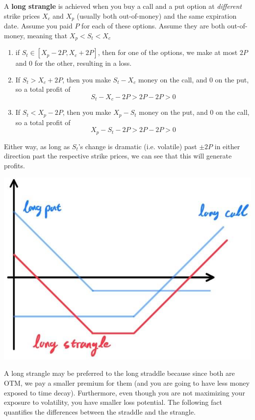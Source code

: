 \documentclass{article}
\begin{document}
  \begin{definition}
    A \textbf{long strangle} is achieved when you buy a call and a put option at \textit{different} strike prices $X_c$ and $X_p$ (usually both out-of-money) and the same expiration date. Assume you paid $P$ for each of these options. Assume they are both out-of-money, meaning that $X_p < S_t < X_c$
    \begin{enumerate}
      \item if $S_t \in [X_p - 2P, X_c + 2P]$, then for one of the options, we make at most $2P$ and $0$ for the other, resulting in a loss. 
      \item If $S_t > X_c + 2P$, then you make $S_t - X_c$ money on the call, and $0$ on the put, so a total profit of 
      \[S_t - X_c - 2P > 2P - 2P > 0\]
      
      \item If $S_t < X_p - 2P$, then you make $X_p - S_t$ money on the put, and $0$ on the call, so a total profit of 
      \[X_p - S_t - 2P > 2P - 2P > 0\]
    \end{enumerate}
    Either way, as long as $S_t$'s change is dramatic (i.e. volatile) past $\pm 2P$ in either direction past the respective strike prices, we can see that this will generate profits. 
    \begin{center}
      \includegraphics[scale=0.3]{img/long_strangle.jpg}
    \end{center}
  \end{definition}

  A long strangle may be preferred to the long straddle because since both are OTM, we pay a smaller premium for them (and you are going to have less money exposed to time decay). Furthermore, even though you are not maximizing your exposure to volatility, you have smaller loss potential. The following fact quantifies the differences between the straddle and the strangle. 
\end{document}
